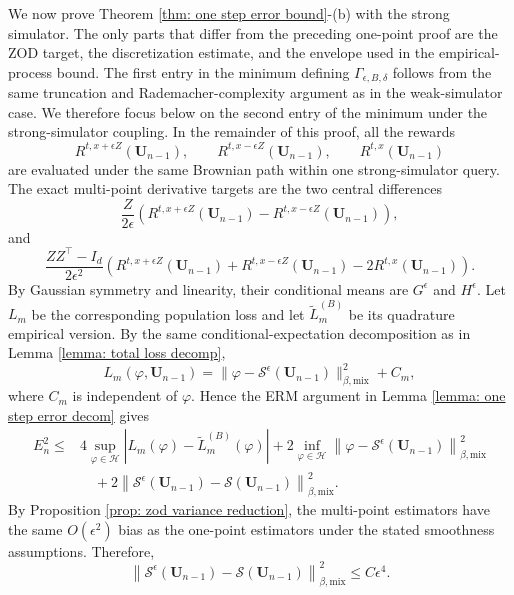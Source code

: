 \documentclass[twoside,11pt]{article}
\newcommand{\1}{\mathbf{1}}
\numberwithin{equation}{section}
\newcommand{\normmix}[1]{\left\|#1\right\|_{\beta, \text{mix}}}
\begin{document}
We now prove Theorem \ref{thm: one step error bound}-(b) with the strong simulator. The only parts that differ from the preceding one-point proof are the ZOD target, the discretization estimate, and the envelope used in the empirical-process bound. The first entry in the minimum defining $\Gamma_{\epsilon,B,\delta}$ follows from the same truncation and Rademacher-complexity argument as in the weak-simulator case. We therefore focus below on the second entry of the minimum under the strong-simulator coupling. In the remainder of this proof, all the rewards
\[
R^{t,x+\epsilon Z}(\mathbf U_{n-1}),\qquad
R^{t,x-\epsilon Z}(\mathbf U_{n-1}),\qquad
R^{t,x}(\mathbf U_{n-1})
\]
are evaluated under the same Brownian path within one strong-simulator query. The exact multi-point derivative targets are the two central differences
\[
\frac{Z}{2\epsilon}
\left(
R^{t,x+\epsilon Z}(\mathbf U_{n-1})
-
R^{t,x-\epsilon Z}(\mathbf U_{n-1})
\right),
\]
and
\[
\frac{ZZ^\top-I_d}{2\epsilon^2}
\left(
R^{t,x+\epsilon Z}(\mathbf U_{n-1})
+
R^{t,x-\epsilon Z}(\mathbf U_{n-1})
-
2R^{t,x}(\mathbf U_{n-1})
\right).
\]
By Gaussian symmetry and linearity, their conditional means are $G^\epsilon$ and $H^\epsilon$. Let $L_m$ be the corresponding population loss and let $\tilde L_m^{(B)}$ be its quadrature empirical version. By the same conditional-expectation decomposition as in Lemma \ref{lemma: total loss decomp},
\begin{equation}
    L_m(\varphi,\mathbf U_{n-1})
    =
    \|\varphi-\mathcal S^\epsilon(\mathbf U_{n-1})\|_{\beta,\mathrm{mix}}^2
    +C_m,
\end{equation}
where $C_m$ is independent of $\varphi$. Hence the ERM argument in Lemma \ref{lemma: one step error decom} gives
\begin{equation}\label{eq: strong one step decom}
\begin{aligned}
E_n^2
\le&
4\sup_{\varphi\in\mathcal H}
\left|L_m(\varphi)-\tilde L_m^{(B)}(\varphi)\right|
+2\inf_{\varphi\in\mathcal H}
\normmix{\varphi-\mathcal S^\epsilon(\mathbf U_{n-1})}^2\\
&\quad
+2\normmix{\mathcal S^\epsilon(\mathbf U_{n-1})
-\mathcal S(\mathbf U_{n-1})}^2 .
\end{aligned}
\end{equation}
By Proposition \ref{prop: zod variance reduction}, the multi-point estimators have the same $O(\epsilon^2)$ bias as the one-point estimators under the stated smoothness assumptions. Therefore,
\begin{equation}\label{eq: strong zod bias}
    \normmix{\mathcal S^\epsilon(\mathbf U_{n-1})
    -\mathcal S(\mathbf U_{n-1})}^2
    \le C\epsilon^4.
\end{equation}
\end{document}
